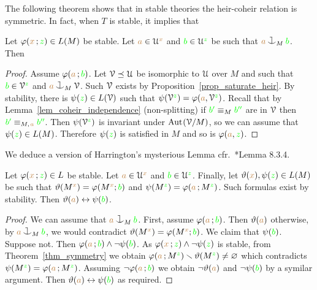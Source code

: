 The following theorem shows that in stable theories the heir-coheir relation is symmetric.
In fact, when $T$ is stable, it implies that


\begin{theorem}[ (Symmetry)]\label{thm_symmetry}
  Let $\varphi({\color{brown} x}\,;{\color{green} z})\in L(M)$ be stable.
  Let ${\color{brown} a}\in\EuScript U^{\color{brown} x}$ and ${\color{green} b}\in\EuScript U^{\color{green} z}$ be such that ${\mr a}\cnonfork_M{\gr b}$.
  Then

\end{theorem}

\vspace*{-\parskip}
\begin{proof}
  Assume $\varphi({\color{brown} a}\,;{\color{green} b})$.
  Let $\EuScript V\preceq\EuScript U$ be isomorphic to $\EuScript U$ over $M$ and such that ${\color{green} b}\in\EuScript V^{\color{green} z}$ and ${\mr a}\cnonfork_M\V$. Such $\EuScript V$ exists by Proposition~\ref{prop_saturate_heir}.
  By stability, there is $\psi({\color{green} z})\in L(\EuScript V)$ such that $\psi(\EuScript V^{\color{green} z})=\varphi({\color{brown} a},\EuScript V^{\color{green} z})$.
  Recall that by Lemma~\ref{lem_coheir_independence} (non-splitting) if ${\color{green} b'}\equiv_M{\color{green} b''}$ are in $\EuScript V$ then ${\color{green} b'}\equiv_{M,\kern.2ex{\color{brown} a}}{\color{green} b''}$.
  Then $\psi(\EuScript V^{\color{green} z})$ is invariant under ${\rm Aut\kern.15ex}(\EuScript V/M)$, so we can assume that $\psi({\color{green} z})\in L(M)$.
  Therefore $\psi({\color{green} z})$ is satisfied in $M$ and so is $\varphi({\color{brown} a},{\color{green} z})$.
\end{proof}

We deduce a version of Harrington's mysterious Lemma cfr.~\cite{TZ}*{Lemma 8.3.4}.

\begin{corollary}\label{corol_harrington0}
  Let $\varphi({\color{brown} x}\,;{\color{green} z})\in L$ be stable.
  Let ${\color{brown} a}\in\EuScript U^{\color{brown} x}$ and ${\color{green} b}\in\EuScript U^{\color{green} z}$.
  Finally, let $\vartheta({\color{brown} x}),\psi({\color{green} z})\in L(M)$ be such that $\vartheta(M^{\color{brown} x})=\varphi(M^{\color{brown} x};{\color{green} b})$ and $\psi(M^{\color{green} z})=\varphi({\color{brown} a}\,;M^{\color{green} z})$.
  Such formulas exist by stability.
  Then $\vartheta({\color{brown} a})\leftrightarrow\psi({\color{green} b})$.
\end{corollary}

\begin{proof}
  We can assume that ${\mr a}\cnonfork_M{\gr b}$.
  First, assume $\varphi({\color{brown} a}\,;{\color{green} b})$.
  Then $\vartheta({\color{brown} a})$ otherwise, by ${\mr a}\cnonfork_M{\gr b}$, we would contradict $\vartheta(M^{\color{brown} x})=\varphi(M^{\color{brown} x};{\color{green} b})$.
  We claim that $\psi({\color{green} b})$.
  Suppose not.
  Then $\varphi({\color{brown} a}\,;{\color{green} b})\wedge\neg\psi({\color{green} b})$.
  As $\varphi({\color{brown} x}\,;{\color{green} z})\wedge\neg\psi({\color{green} z})$ is stable, from Theorem~\ref{thm_symmetry} we obtain $\varphi({\color{brown} a}\,;M^{\color{green} z})\smallsetminus\vartheta(M^{\color{green} z})\neq\varnothing$ which contradicts  $\psi(M^{\color{green} z})=\varphi({\color{brown} a}\,;M^{\color{green} z})$.
  Assuming $\neg\varphi({\color{brown} a}\,;{\color{green} b})$ we obtain $\neg\vartheta({\color{brown} a})$ and $\neg\psi({\color{green} b})$ by a symilar argument.
  Then $\vartheta({\color{brown} a})\leftrightarrow\psi({\color{green} b})$ as required.
\end{proof}

